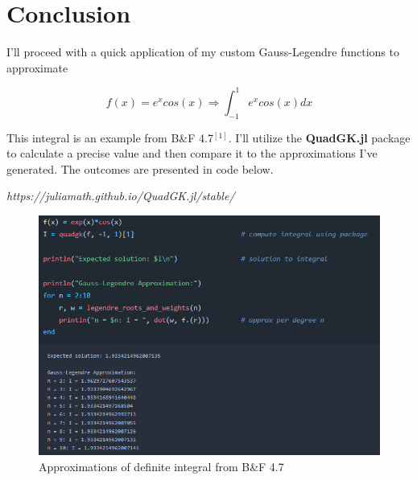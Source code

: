 \documentclass[twoside]{article}
\begin{document}


\newpage

\section{Conclusion}

I'll proceed with a quick application of my custom Gauss-Legendre functions to approximate

\[
f(x) = e^x cos(x) \Longrightarrow \int_{-1}^{1} e^x cos(x) dx
\]

This integral is an example from B\&F 4.7\(^{[1]}\). I'll utilize the \textbf{QuadGK.jl} package to calculate a precise value and then compare it to the approximations I've generated. The outcomes are presented in code below.

\textit{https://juliamath.github.io/QuadGK.jl/stable/}

\begin{figure}[ht]
\centering
\includegraphics[scale=0.8]{img/apprx.png}
\caption{Approximations of definite integral from B\&F 4.7}
\end{figure}
\end{document}
